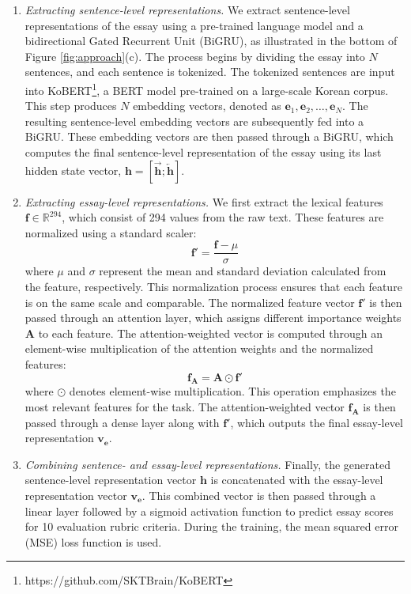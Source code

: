\begin{enumerate}[label={{\roman*)}}, leftmargin=1.1em]
\item {\textsf{\textit{Extracting sentence-level representations.} } 
We extract sentence-level representations of the essay using a pre-trained language model and a bidirectional Gated Recurrent Unit (BiGRU), as illustrated in the bottom of Figure \ref{fig:approach}(c).
The process begins by dividing the essay into $N$ sentences, and each sentence is tokenized.
The tokenized sentences are input into KoBERT\footnote{https://github.com/SKTBrain/KoBERT}, a BERT model pre-trained on a large-scale Korean corpus.
This step produces $N$ embedding vectors, denoted as $\mathbf{e}_1, \mathbf{e}_2, \dots, \mathbf{e}_N$.
The resulting sentence-level embedding vectors are subsequently fed into a BiGRU. 
These embedding vectors are then passed through a BiGRU, which computes the final sentence-level representation of the essay using its last hidden state vector, $\mathbf{h} = [\overrightarrow{\mathbf{h}}; \overleftarrow{\mathbf{h}}]$.
}
%
\item {\textsf{\textit{Extracting essay-level representations.} } 
We first extract the lexical features $\mathbf{f} \in \mathbb{R}^{294}$, which consist of 294 values from the raw text. 
These features are normalized using a standard scaler:
\begin{equation}
\mathbf{f'} = \frac{\mathbf{f} - \mu}{\sigma}
\end{equation}
where $\mu$ and $\sigma$ represent the mean and standard deviation calculated from the feature, respectively. 
This normalization process ensures that each feature is on the same scale and comparable. 
The normalized feature vector $\mathbf{f'}$ is then passed through an attention layer, which assigns different importance weights $\mathbf{A}$ to each feature. 
The attention-weighted vector is computed through an element-wise multiplication of the attention weights and the normalized features:
\begin{equation}
\mathbf{f_A} = \mathbf{A} \odot \mathbf{f'}
\end{equation}
where $\odot$ denotes element-wise multiplication. 
This operation emphasizes the most relevant features for the task. 
The attention-weighted vector $\mathbf{f_A}$ is then passed through a dense layer along with $\mathbf{f'}$, which outputs the final essay-level representation $\mathbf{v_e}$.
}
%
\item {\textsf{\textit{Combining sentence- and essay-level representations.} } 
Finally, the generated sentence-level representation vector $\mathbf{h}$ is concatenated with the essay-level representation vector $\mathbf{v_e}$. 
This combined vector is then passed through a linear layer followed by a sigmoid activation function to predict essay scores for 10 evaluation rubric criteria. 
During the training, the mean squared error (MSE) loss function is used.
}

\end{enumerate} 

